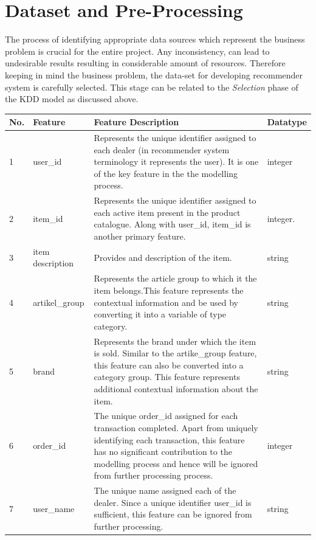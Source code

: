 \section{Dataset and Pre-Processing} \label{sect:thefirst}
The process of identifying appropriate data sources which represent the business problem is crucial for the entire project. Any inconsistency, can lead to undesirable results resulting in considerable amount of resources. Therefore keeping in mind the business problem, the data-set for developing recommender system is carefully selected. This stage can be related to the \textit{Selection} phase of the KDD model as discussed above. \\ \Par

\begin{table}
\begin{tabular}{ |m{0.5cm}| m{3cm} | m{8cm}| m{2cm} | } 
\hline 
No. & Feature & Feature Description & Datatype \\ 
\hline \hline
1 & user{\_}id
 & Represents the unique identifier assigned to each dealer (in recommender system terminology it represents the user). It is one of the key feature in the the modelling process. & integer \\ 
\hline
2 & item{\_}id & Represents the unique identifier assigned to each active item present in the product catalogue. Along with user{\_}id, item{\_}id is another primary feature. & integer. \\
\hline
3 & item description & Provides and description of the item. & string \\
\hline
4 & artikel{\_}group & Represents the article group to which it the item belongs.This feature represents the contextual information and be used by converting it into a variable of type category. & string \\
\hline
5 & brand & Represents the brand under which the item is sold. Similar to the artike{\_}group feature, this feature can also be converted into a category group. This feature represents additional contextual information about the item. & string \\
\hline
6 & order{\_}id & The unique order{\_}id assigned for each transaction completed. Apart from uniquely identifying each transaction, this feature has no significant contribution to the modelling process and hence will be ignored from further processing process. & integer \\
\hline
7 & user{\_}name & The unique name assigned each of the dealer. Since a unique identifier user{\_}id is sufficient, this feature can be ignored from further processing. & string \\ 

\end{tabular}
\end{table}
